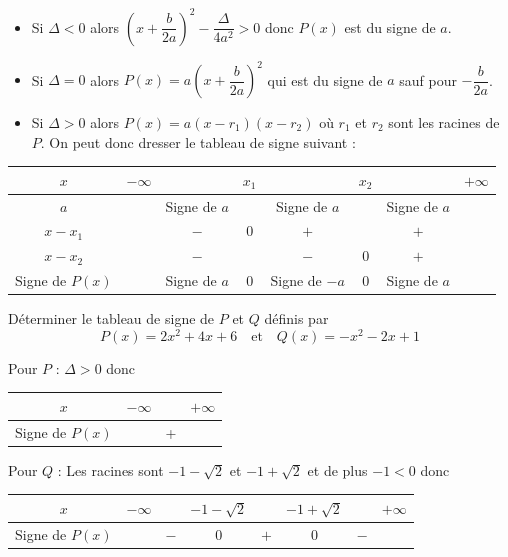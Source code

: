 \documentclass[french]{book}
\begin{document}
\begin{demo}
\begin{itemize}
\item Si $\Delta<0$ alors $\left(x+\dfrac{b}{2a}\right)^{2}-\dfrac{\Delta}{4a^{2}}>0$ donc $P(x)$ est  du signe de $a$.
\item Si $\Delta=0$ alors $P(x)=a\left(x+\dfrac{b}{2a}\right)^{2}$ qui est du signe de $a$ sauf pour $-\dfrac{b}{2a}$.
\item Si $\Delta>0$ alors $P(x)=a(x-r_{1})(x-r_{2})$ où $r_{1}$ et $r_{2}$ sont les racines de $P$. On peut donc dresser le tableau de signe suivant :

\end{itemize}
\vspace{1ex}
\begin{tabular}[c]{|c|ccccccc|} \hline
$x$ & $-\infty$ &  & $x_{1}$ &  & $x_{2}$ &  & $+\infty$ \\ \hline
$a$ &  & Signe de $a$ &  & Signe de $a$ &  & Signe de $a$ & \\ \hline
$x-x_{1}$ &  & $-$ & 0 & $+$ &  & $+$ & \\ \hline
$x-x_{2}$ &  & $-$ &  & $-$ & 0 & $+$ & \\ \hline
Signe de $P(x)$ &  & Signe de $a$ & 0 & Signe de $-a$ & 0 & Signe de $a$ & \\ \hline
\end{tabular}

\vspace{1ex}
\end{demo}

\begin{exemple}
Déterminer le tableau de signe de $P$ et $Q$ définis par
 \[P(x)=2x^{2}+4x+6 \quad \text{et} \quad Q(x)=-x^{2}-2x+1\]
\end{exemple}


Pour $P$ : $\Delta>0$ donc

\begin{center}
\begin{tabular}[c]{|c|ccc|} \hline
$x$ & $-\infty$ &  & $+\infty$ \\ \hline
Signe de $P(x)$ &  & + & \\ \hline
\end{tabular}
\end{center}

Pour $Q$ : Les racines sont $-1-\sqrt{2}$ et $-1+\sqrt{2}$ et de plus $-1<0$ donc

\vspace{1ex}
\begin{center}
\begin{tabular}[c]{|c|ccccccc|} \hline
$x$ & $-\infty$ &  & $-1-\sqrt{2}$ &  & $-1+\sqrt{2}$ &  & $+\infty$ \\ \hline
Signe de $P(x)$ &  & $-$ & 0 & $+$ & 0 & $-$ & \\ \hline
\end{tabular}
\end{center}
\end{document}
